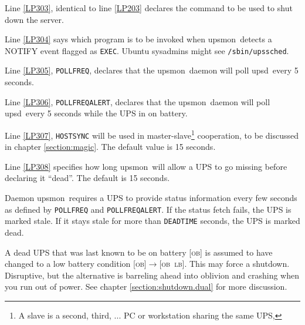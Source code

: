\documentclass[12pt]{article}
\newcommand{\upsd}{\mbox{\textcolor{UPSDCOLOUR}{upsd}}}
\newcommand{\upsmon}{\mbox{\textcolor{MONCOLOUR}{upsmon}}}
\newcommand{\LB}{\textcolor{UPSDCOLOUR}{\textsc{lb}}}
\newcommand{\OB}{\textcolor{UPSDCOLOUR}{\textsc{ob}}}
\newcommand{\status}[1]{\textcolor{UPSDCOLOUR}{[{#1}]}}
\newcommand{\statuschange}[2]{\status{#1}{\allowbreak}\textcolor{UPSDCOLOUR}{$\rightarrow$}{\allowbreak}\status{#2}}
\begin{document}
Line \ref{LP303}, identical to line \ref{LP203} declares the command to be
used to shut down the server.

Line \ref{LP304} says which program is to be invoked when \upsmon\ detects a
NOTIFY event flagged as \texttt{EXEC}. Ubuntu sysadmins might see
\texttt{/sbin/{\allowbreak}upssched}.

Line \ref{LP305}, \texttt{POLLFREQ}, declares that the \upsmon\ daemon will
poll \upsd\ every 5 seconds.

Line \ref{LP306}, \texttt{POLLFREQALERT}, declares that the \upsmon\ daemon
will poll \upsd\ every 5 seconds while the UPS in on battery.

Line \ref{LP307}, \texttt{HOSTSYNC} will be used in master-slave\footnote{A
  slave is a second, third, ... PC or workstation sharing the same UPS,}
cooperation, to be discussed in chapter \ref{section:magic}.  The default
value is 15 seconds.

Line \ref{LP308} specifies how long \upsmon\ will allow a UPS to go missing
before declaring it ``dead''. The default is 15 seconds.

Daemon \upsmon\ requires a UPS to provide status information every few seconds
as defined by \texttt{POLLFREQ} and \texttt{POLLFREQALERT}. If the status
fetch fails, the UPS is marked stale. If it stays stale for more than
\texttt{DEADTIME} seconds, the UPS is marked dead.

A dead UPS that was last known to be on battery \status{\OB} is assumed to
have changed to a low battery condition \statuschange{\OB}{\OB\ \LB}. This may
force a shutdown. Disruptive, but the alternative is barreling ahead into
oblivion and crashing when you run out of power.
See chapter \ref{section:shutdown.dual} for more discussion.
\end{document}
